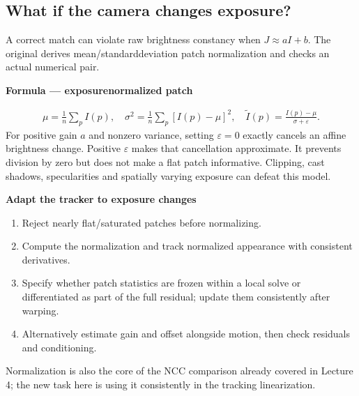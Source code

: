 \documentclass[letterpaper,11pt,english,openany,oneside]{jupyterBook}
\begin{document}
\subsection{What if the camera changes exposure?}
\label{\detokenize{lectures/lecture05/tracking:what-if-the-camera-changes-exposure}}
\sphinxAtStartPar
A correct match can violate raw brightness constancy when \(J\approx aI+b\). The original {\hyperref[\detokenize{lectures/lecture05/quiz-workbook:quiz-9-q1}]{}} derives mean/standard\sphinxhyphen{}deviation patch normalization and checks an actual numerical pair.

\begin{TextbookBox}
\textbf{Formula — exposure\sphinxhyphen{}normalized patch}\par\smallskip
\begin{equation}\label{equation:lectures/lecture05/tracking:eq-lec05-photometric}
\begin{split}\mu=\frac1n\sum_p I(p),\quad
\sigma^2=\frac1n\sum_p[I(p)-\mu]^2,\quad
\widetilde I(p)=\frac{I(p)-\mu}{\sigma+\varepsilon}.\end{split}
\end{equation}
\sphinxAtStartPar
For positive gain \(a\) and nonzero variance, setting \(\varepsilon=0\) exactly cancels an affine brightness change. Positive \(\varepsilon\) makes that cancellation approximate. It prevents division by zero but does not make a flat patch informative. Clipping, cast shadows, specularities and spatially varying exposure can defeat this model.

\end{TextbookBox}

\begin{TextbookBox}
\textbf{Adapt the tracker to exposure changes}\par\smallskip
\begin{enumerate}
%
\item {}
\sphinxAtStartPar
Reject nearly flat/saturated patches before normalizing.

\item {}
\sphinxAtStartPar
Compute the normalization and track normalized appearance with consistent derivatives.

\item {}
\sphinxAtStartPar
Specify whether patch statistics are frozen within a local solve or differentiated as part of the full residual; update them consistently after warping.

\item {}
\sphinxAtStartPar
Alternatively estimate gain and offset alongside motion, then check residuals and conditioning.

\end{enumerate}

\sphinxAtStartPar
Normalization is also the core of the NCC comparison already covered in Lecture 4; the new task here is using it consistently in the tracking linearization.

\end{TextbookBox}
\end{document}
